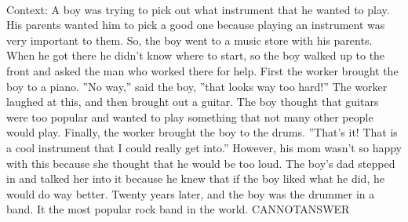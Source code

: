 \documentclass[11pt,a4paper, onecolumn]{article}
\begin{document}
\\ Context: A boy was trying to pick out what instrument that he wanted to play. His parents wanted him to pick a good one because playing an instrument was very important to them. So, the boy went to a music store with his parents. When he got there he didn't know where to start, so the boy walked up to the front and asked the man who worked there for help. First the worker brought the boy to a piano. ''No way,'' said the boy, ''that looks way too hard!'' The worker laughed at this, and then brought out a guitar. The boy thought that guitars were too popular and wanted to play something that not many other people would play. Finally, the worker brought the boy to the drums. ''That's it! That is a cool instrument that I could really get into.'' However, his mom wasn't so happy with this because she thought that he would be too loud. The boy's dad stepped in and talked her into it because he knew that if the boy liked what he did, he would do way better. Twenty years later, and the boy was the drummer in a band. It the most popular rock band in the world. CANNOTANSWER
\end{document}
